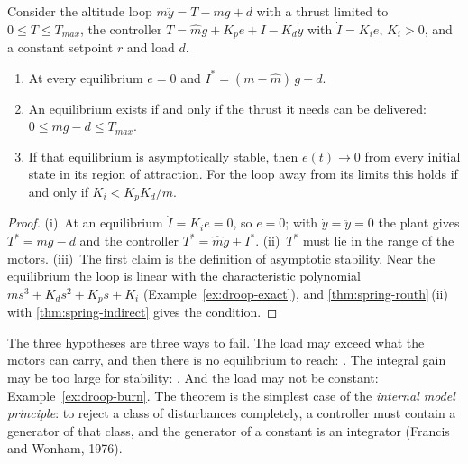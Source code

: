 \begin{theorem}
\label{thm:droop-integral}
Consider the altitude loop $m\ddot y = T - mg + d$ with a thrust limited to $0 \le T \le T_{max}$, the controller $T = \hat m g + K_p e + I - K_d\dot y$ with $\dot I = K_i e$, $K_i > 0$, and a constant setpoint $r$ and load $d$.
\begin{enumerate}[label=(\roman*)]
  \item At every equilibrium $e = 0$ and $I^* = (m - \hat m)\,g - d$.
  \item An equilibrium exists if and only if the thrust it needs can be delivered: $0 \le mg - d \le T_{max}$.
  \item If that equilibrium is asymptotically stable, then $e(t) \to 0$ from every initial state in its region of attraction. For the loop away from its limits this holds if and only if $K_i < K_p K_d/m$.
\end{enumerate}
\end{theorem}
\begin{proof}
(i)~At an equilibrium $\dot I = K_i e = 0$, so $e = 0$; with $\dot y = \ddot y = 0$ the plant gives $T^* = mg - d$ and the controller $T^* = \hat m g + I^*$. (ii)~$T^*$ must lie in the range of the motors. (iii)~The first claim is the definition of asymptotic stability. Near the equilibrium the loop is linear with the characteristic polynomial $m s^3 + K_d s^2 + K_p s + K_i$ (Example~\ref{ex:droop-exact}), and \cref{thm:spring-routh}\,(ii) with \cref{thm:spring-indirect} gives the condition.
\end{proof}

The three hypotheses are three ways to fail. The load may exceed what the motors can carry, and then there is no equilibrium to reach: . The integral gain may be too large for stability: . And the load may not be constant: Example~\ref{ex:droop-burn}. The theorem is the simplest case of the \emph{internal model principle}: to reject a class of disturbances completely, a controller must contain a generator of that class, and the generator of a constant is an integrator (Francis and Wonham, 1976).

